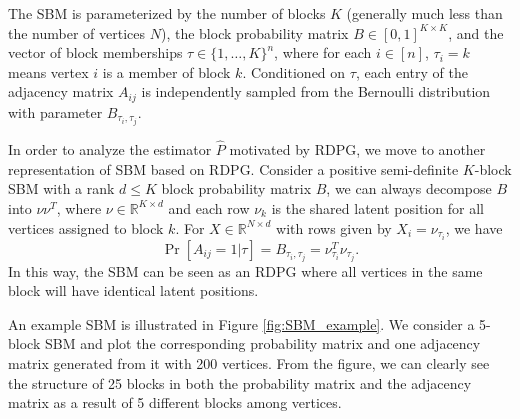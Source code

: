 \documentclass[a4paper]{article}
\begin{document}
The SBM is parameterized by the number of blocks $K$ (generally much less than the number of vertices $N$), the block probability matrix $B \in [0,1]^{K \times K}$, and the vector of block memberships
$\tau\in\{1,\dotsc,K\}^n$, where for each $i \in [n]$, $\tau_i = k$ means vertex $i$ is a member of block $k$.
Conditioned on $\tau$, each entry of the adjacency matrix $A_{ij}$ is independently sampled from the Bernoulli distribution with parameter $B_{\tau_i,\tau_j}$.

In order to analyze the estimator $\hat{P}$ motivated by RDPG, we move to another representation of SBM based on RDPG. 
Consider a positive semi-definite $K$-block SBM with a rank $d\le K$ block probability matrix $B$, we can always decompose $B$ into $\nu \nu^T$, where $\nu \in \mathbb{R}^{K \times d}$ and each row $\nu_k$ is the shared latent position for all vertices assigned to block $k$. 
For $X \in \mathbb{R}^{N \times d}$ with rows given by $X_i = \nu_{\tau_i}$, we have
\[
	\Pr[A_{ij} = 1|\tau] = B_{\tau_i, \tau_j} = \nu_{\tau_i}^T \nu_{\tau_j}.
\]
In this way, the SBM can be seen as an RDPG where all vertices in the same block will have identical latent positions.

An example SBM is illustrated in Figure \ref{fig:SBM_example}.
We consider a 5-block SBM and plot the corresponding probability matrix and one adjacency matrix generated from it with 200 vertices. From the figure, we can clearly see the structure of 25 blocks in both the probability matrix and the adjacency matrix as a result of 5 different blocks among vertices.
\end{document}
